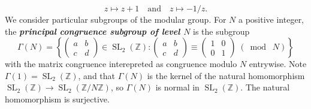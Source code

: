 \documentclass[10pt,leqno]{article}
\newcommand{\cbr}[1]{\left\{#1\right\}}
\newcommand{\textib}[1]{\textbf{\textit{#1}}}
\DeclareMathOperator{\SL}{SL}
\newcommand{\smod}[1]{\;(\bmod\; #1)}
\begin{document}
\[z\mapsto z+1\quad\text{and}\quad z\mapsto -1/z.\]
We consider particular subgroups of the modular group. For $N$ a positive integer, the \textib{principal congruence subgroup of level $N$} is the subgroup
\[\varGamma(N) = \cbr{\begin{pmatrix}
    a & b \\ c & d
\end{pmatrix}\in \SL_2(\mathbb{Z}): \begin{pmatrix}
    a & b \\ c & d
\end{pmatrix}\equiv \begin{pmatrix}
    1 & 0 \\ 0 & 1
\end{pmatrix}\smod N}\]
with the matrix congruence interepreted as congruence modulo $N$ entrywise. Note $\varGamma(1) = \SL_2(\mathbb{Z})$, and that $\varGamma(N)$ is the kernel of the natural homomorphism $\SL_2(\mathbb{Z})\to \SL_2(\mathbb{Z}/N\mathbb{Z})$, so $\varGamma(N)$ is normal in $\SL_2(\mathbb{Z})$. The natural homomorphism is surjective.
\end{document}
